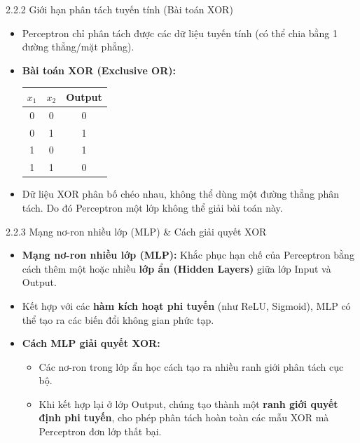 \documentclass{beamer}
\begin{document}
\begin{frame}{2.2.2 Giới hạn phân tách tuyến tính (Bài toán XOR)}
  \begin{itemize}
    \item Perceptron chỉ phân tách được các dữ liệu tuyến tính (có thể chia bằng 1 đường thẳng/mặt phẳng).
    \item \textbf{Bài toán XOR (Exclusive OR):}
    \begin{table}[H]
    \centering
    \begin{tabular}{|c|c|c|}
    \hline
    $x_1$ & $x_2$ & Output \\
    \hline
    0 & 0 & 0 \\
    0 & 1 & 1 \\
    1 & 0 & 1 \\
    1 & 1 & 0 \\
    \hline
    \end{tabular}
    \end{table}
    \item Dữ liệu XOR phân bố chéo nhau, không thể dùng một đường thẳng phân tách. Do đó Perceptron một lớp không thể giải bài toán này.
  \end{itemize}
\end{frame}

\begin{frame}{2.2.3 Mạng nơ-ron nhiều lớp (MLP) \& Cách giải quyết XOR}
  \begin{itemize}
    \item \textbf{Mạng nơ-ron nhiều lớp (MLP):} Khắc phục hạn chế của Perceptron bằng cách thêm một hoặc nhiều \textbf{lớp ẩn (Hidden Layers)} giữa lớp Input và Output.
    \item Kết hợp với các \textbf{hàm kích hoạt phi tuyến} (như ReLU, Sigmoid), MLP có thể tạo ra các biến đổi không gian phức tạp.
    \item \textbf{Cách MLP giải quyết XOR:}
    \begin{itemize}
        \item Các nơ-ron trong lớp ẩn học cách tạo ra nhiều ranh giới phân tách cục bộ.
        \item Khi kết hợp lại ở lớp Output, chúng tạo thành một \textbf{ranh giới quyết định phi tuyến}, cho phép phân tách hoàn toàn các mẫu XOR mà Perceptron đơn lớp thất bại.
    \end{itemize}
  \end{itemize}
\end{frame}
\end{document}
